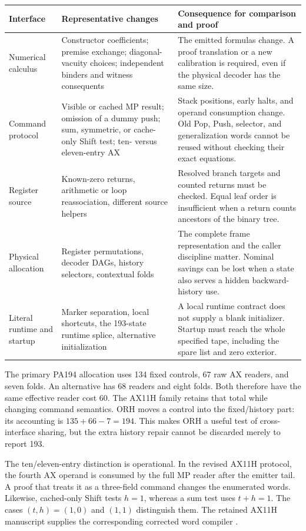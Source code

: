 \documentclass[11pt,a4paper]{article}
\begin{document}
\begin{longtable}{L{26mm}L{53mm}L{68mm}}
\toprule
Interface & Representative changes & Consequence for comparison and proof\\
\midrule\endhead
Numerical calculus & Constructor coefficients; premise exchange;
diagonal-vacuity choices; independent binders and witness consequents &
The emitted formulas change. A proof translation or a new calibration is
required, even if the physical decoder has the same size.\\
Command protocol & Visible or cached MP result; omission of a dummy push;
sum, symmetric, or cache-only Shift test; ten- versus eleven-entry AX &
Stack positions, early halts, and operand consumption change. Old Pop,
Push, selector, and generalization words cannot be reused without checking
their exact equations.\\
Register source & Known-zero returns, arithmetic or loop reassociation,
different source helpers & Resolved branch targets and counted returns
must be checked. Equal leaf order is insufficient when a return counts
ancestors of the binary tree.\\
Physical allocation & Register permutations, decoder DAGs, history
selectors, contextual folds & The complete frame representation and the
caller discipline matter. Nominal savings can be lost when a state also
serves a hidden backward-history use.\\
Literal runtime and startup & Marker separation, local shortcuts, the
193-state runtime splice, alternative initialization & A local runtime
contract does not supply a blank initializer. Startup must reach the whole
specified tape, including the spare list and zero exterior.\\
\bottomrule
\end{longtable}

The primary PA194 allocation uses 134 fixed controls, 67 raw AX readers,
and seven folds. An alternative has 68 readers and eight folds. Both
therefore have the same effective reader cost 60. The AX11H family retains
that total while changing command semantics. ORH moves a control into the
fixed/history part: its accounting is $135+66-7=194$. This makes ORH a useful
test of cross-interface sharing, but the extra history repair cannot be
discarded merely to report 193.

The ten/eleven-entry distinction is operational. In the revised AX11H
protocol, the fourth AX operand is consumed by the full MP reader after the
emitter tail. A proof that treats it as a three-field command changes the
enumerated words. Likewise, cached-only Shift tests $h=1$, whereas a sum
test uses $t+h=1$. The cases $(t,h)=(1,0)$ and $(1,1)$ distinguish them.
The retained AX11H manuscript supplies the corresponding corrected word
compiler \cite{ax11h}.
\end{document}
